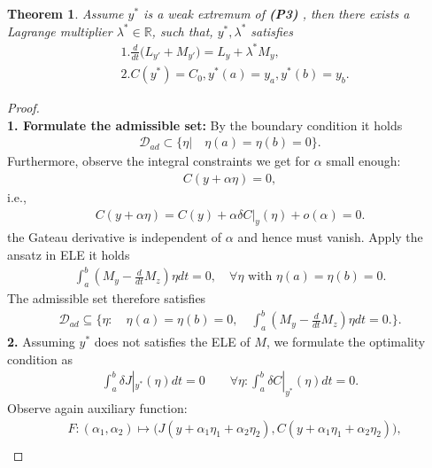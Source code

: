 \documentclass[a4paper,11pt,fleqn]{book}
\newtheorem{theorem}{Theorem}[section]
\theoremstyle{definition}
\theoremstyle{remark}
\begin{document}
\begin{theorem}
Assume $y^*$ is a weak extremum of \textbf{(P3)} , then there exists a Lagrange multiplier $\lambda^* \in \mathbb{R}$, such that,  $y^*, \lambda^* $ satisfies
\begin{equation}
\begin{aligned}
	&1. \frac{d}{dt}\bigg(L_{y'} + M_{y'} \bigg) = L_y+ \lambda^* M_y, \\
	&2.  C(y^*) = C_0, y^*(a) = y_a,  y^*(b) = y_b. 
\end{aligned}
\end{equation}
\end{theorem}
\begin{proof}\quad\\
\textbf{1. Formulate the admissible set:}
	By the boundary condition it holds
	\begin{align*}
		\mathcal{D}_{ad} \subset \{\eta | \quad \eta(a) = \eta(b) = 0\}. 
	\end{align*}
	Furthermore, observe the integral constraints we get for $\alpha$ small enough:
	\begin{align*}
		C(y + \alpha \eta ) = 0, 
	\end{align*}
	i.e., 
	\begin{align*}
		C(y + \alpha \eta) = C(y) + \alpha \delta C|_y(\eta) + o(\alpha) = 0. 
	\end{align*}
	the Gateau derivative is independent of $\alpha$ and hence must vanish. Apply the ansatz in ELE it holds
	\begin{align*}
		\int_a^b (M_y - \frac{d}{dt}M_z) \eta dt = 0, \quad \forall \eta \text{ with } \eta(a) = \eta(b) = 0.  
	\end{align*}
	The admissible set therefore satisfies
	\begin{align*}
		\mathcal{D}_{ad} \subseteq \bigg\{\eta: \quad \eta(a) = \eta(b) = 0, \quad \int_a^b(M_y - \frac{d}{dt}M_z)\eta dt = 0. \bigg\}. 
	\end{align*}
	\textbf{2.} Assuming $y^*$ does not satisfies the ELE of $M$, we formulate the optimality condition as
	\begin{align*}
		\int_a^b \delta J|_{y^*} (\eta) dt = 0 \qquad \forall \eta : \int_a^b \delta C|_{y^*}(\eta) dt = 0. 
	\end{align*} 
	Observe again auxiliary function:
	\begin{align*}
		& F: (\alpha_1, \alpha_2) \mapsto \bigg( J(y + \alpha_1 \eta_1 + \alpha_2 \eta_2), C(y + \alpha_1 \eta_1 + \alpha_2 \eta_2) \bigg), \\

\end{align*}
\end{proof}
\end{document}
